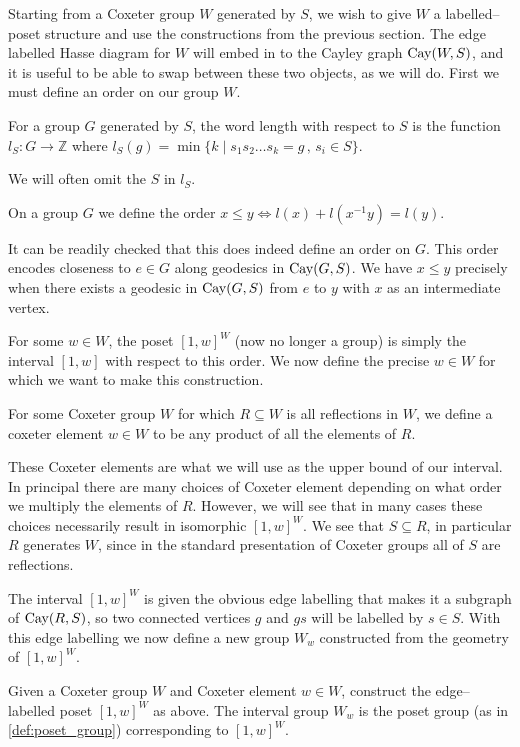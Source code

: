 \documentclass[class=article, crop=false]{standalone}
\begin{document}
Starting from a Coxeter group $W$ generated by $S$, we wish to give $W$ a labelled--poset structure and use the constructions from the previous section. The edge labelled Hasse diagram for $W$ will embed in to the Cayley graph $\text{Cay}(W,S)$, and it is useful to be able to swap between these two objects, as we will do. First we must define an order on our group $W$.
\begin{definition}
	For a group $G$ generated by $S$, the word length with respect to $S$ is the function $l_S:G\to \mathbb{Z}$ where $l_S(g) = \min\{k \mid s_1s_2\ldots s_k=g \,,\, s_i \in S \}$.
\end{definition}

We will often omit the $S$ in $l_S$.

\begin{definition}
	On a group $G$ we define the order $x \leq y \iff l(x) + l(x^{-1}y) = l(y)$.
\end{definition}

It can be readily checked that this does indeed define an order on $G$. This order encodes closeness to $e \in G$ along geodesics in $\text{Cay}(G,S)$. We have $x \leq y$ precisely when there exists a geodesic in $\text{Cay}(G, S)$ from $e$ to $y$ with $x$ as an intermediate vertex.

For some $w \in W$, the poset $[1,w]^W$ (now no longer a group) is simply the interval $[1,w]$ with respect to this order. We now define the precise $w \in W$ for which we want to make this construction.

\begin{definition}
	For some Coxeter group $W$ for which $R \subseteq W$ is all reflections in $W$, we define a coxeter element $w\in W$ to be any product of all the elements of $R$.
\end{definition}

These Coxeter elements are what we will use as the upper bound of our interval. In principal there are many choices of Coxeter element depending on what order we multiply the elements of $R$. However, we will see that in many cases these choices necessarily result in isomorphic $[1,w]^W$. We see that $S \subseteq R$, in particular $R$ generates $W$, since in the standard presentation of Coxeter groups all of $S$ are reflections.

The interval $[1,w]^W$ is given the obvious edge labelling that makes it a subgraph of $\text{Cay}(R,S)$, so two connected vertices $g$ and $gs$ will be labelled by $s \in S$. With this edge labelling we now define a new group $W_w$ constructed from the geometry of $[1,w]^W$.

\begin{definition}
	Given a Coxeter group $W$ and Coxeter element $w\in W$, construct the edge--labelled poset $[1,w]^W$ as above. The interval group $W_w$ is the poset group (as in \cref{def:poset_group}) corresponding to $[1,w]^W$.
\end{definition}
\end{document}
